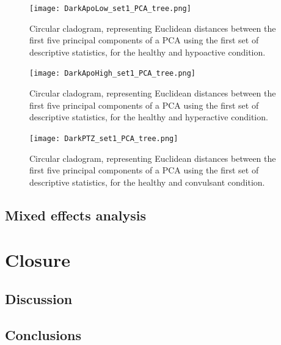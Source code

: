 \documentclass[a4paper,12pt]{article}
\begin{document}
\newpage
\begin{figure}[h!]
\begin{center}
\texttt{[image: DarkApoLow\_set1\_PCA\_tree.png]}
\caption{Circular cladogram, representing Euclidean distances between the first five principal components of a PCA using the first set of descriptive statistics, for the healthy and hypoactive condition.}
\end{center}
\end{figure}
\begin{figure}[h!]
\begin{center}
\texttt{[image: DarkApoHigh\_set1\_PCA\_tree.png]}
\caption{Circular cladogram, representing Euclidean distances between the first five principal components of a PCA using the first set of descriptive statistics, for the healthy and hyperactive condition.}
\end{center}
\end{figure}
\newpage
\begin{figure}[h!]
\begin{center}
\texttt{[image: DarkPTZ\_set1\_PCA\_tree.png]}
\caption{Circular cladogram, representing Euclidean distances between the first five principal components of a PCA using the first set of descriptive statistics, for the healthy and convulsant condition.}
\end{center}
\end{figure}
\subsection{Mixed effects analysis}


\section{Closure}
\subsection{Discussion}


\subsection{Conclusions}
\end{document}
